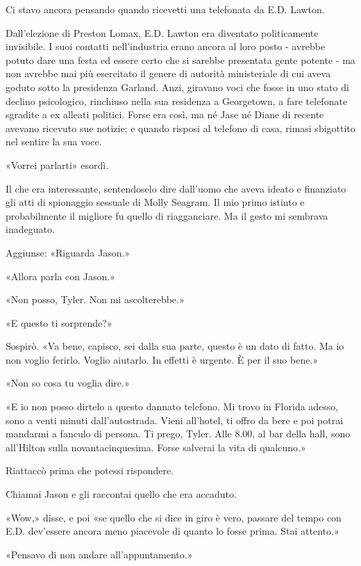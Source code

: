 Ci stavo ancora pensando quando ricevetti una telefonata da E.D. Lawton.

\separatorefiori

Dall'elezione di Preston Lomax, E.D. Lawton era diventato politicamente
invisibile. I suoi contatti nell'industria erano ancora al loro posto -
avrebbe potuto dare una festa ed essere certo che si sarebbe presentata
gente potente - ma non avrebbe mai più esercitato il genere di autorità
ministeriale di cui aveva goduto sotto la presidenza Garland. Anzi,
giravano voci che fosse in uno stato di declino psicologico, rinchiuso
nella sua residenza a Georgetown, a fare telefonate sgradite a ex
alleati politici. Forse era così, ma né Jase né Diane di recente avevano
ricevuto sue notizie; e quando risposi al telefono di casa, rimasi
sbigottito nel sentire la sua voce.

«Vorrei parlarti» esordì.

Il che era interessante, sentendoselo dire dall'uomo che aveva ideato e
finanziato gli atti di spionaggio sessuale di Molly Seagram. Il mio
primo istinto e probabilmente il migliore fu quello di riagganciare. Ma
il gesto mi sembrava inadeguato.

Aggiunse: «Riguarda Jason.»

«Allora parla con Jason.»

«Non posso, Tyler. Non mi ascolterebbe.»

«E questo ti sorprende?»

Sospirò. «Va bene, capisco, sei dalla sua parte, questo è un dato di
fatto. Ma io non voglio ferirlo. Voglio aiutarlo. In effetti è urgente.
È per il suo bene.»

«Non so cosa tu voglia dire.»

«E io non posso dirtelo a questo dannato telefono. Mi trovo in Florida
adesso, sono a venti minuti dall'autostrada. Vieni all'hotel, ti offro
da bere e poi potrai mandarmi a fanculo di persona. Ti prego, Tyler.
Alle 8.00, al bar della hall, sono all'Hilton sulla novantacinquesima.
Forse salverai la vita di qualcuno.»

Riattaccò prima che potessi rispondere.

Chiamai Jason e gli raccontai quello che era accaduto.

«Wow,» disse, e poi «se quello che si dice in giro è vero, passare del
tempo con E.D. dev'essere ancora meno piacevole di quanto lo fosse
prima. Stai attento.»

«Pensavo di non andare all'appuntamento.»

